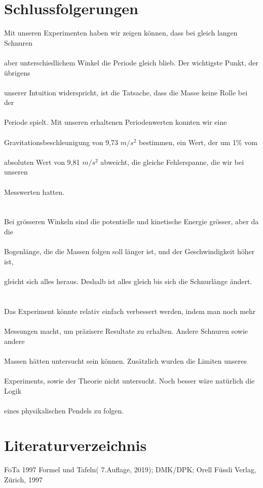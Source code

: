 \documentclass[12pt, a4paper, twoside]{article}
\begin{document}
        \section{Schlussfolgerungen}
        Mit unseren Experimenten haben wir zeigen können, dass bei gleich langen Schnuren\\\\
        aber unterschiedlichem Winkel die Periode gleich blieb. Der wichtigste Punkt, der übrigens\\\\
        unserer Intuition widerspricht, ist die Tatsache, dass die Masse keine Rolle bei der\\\\
        Periode spielt. Mit unseren erhaltenen Periodenwerten konnten wir eine\\\\
        Gravitationsbeschleunigung von 9,73 $m/s^2$  bestimmen, ein Wert, der um 1\% vom \\\\
        absoluten Wert von 9,81 $m/s^2$ abweicht, die gleiche Fehlerspanne, die wir bei unseren\\\\
        Messwerten hatten.\\\\\\
        Bei grösseren Winkeln sind die potentielle und kinetische Energie grösser, aber da die\\\\
        Bogenlänge, die die Massen folgen soll länger ist, und der Geschwindigkeit höher ist,\\\\
        gleicht sich alles heraus. Deshalb ist alles gleich bis sich die Schnurlänge ändert.\\\\\\
        Das Experiment könnte relativ einfach verbessert werden, indem man noch mehr\\\\
        Messungen macht, um präzisere Resultate zu erhalten. Andere Schnuren sowie andere \\\\
        Massen hätten untersucht sein können. Zusätzlich wurden die Limiten unseres \\\\
        Experiments, sowie der Theorie nicht untersucht. Noch besser wäre natürlich die Logik\\\\
        eines physikalischen Pendels zu folgen.
        \newpage
        \section{Literaturverzeichnis}
        \small
        FoTa 1997      Formel und Tafeln( 7.Auflage, 2019); DMK/DPK; Orell Füssli Verlag, Zürich, 1997
        
\end{document}

